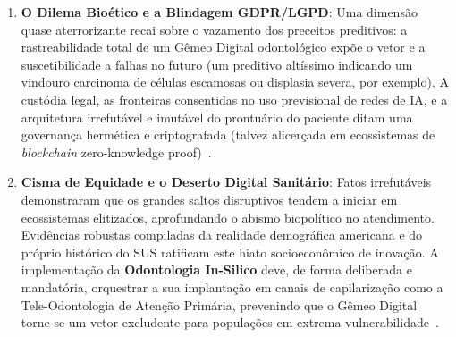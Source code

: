 \begin{enumerate}
    \item \textbf{O Dilema Bioético e a Blindagem GDPR/LGPD}: Uma dimensão quase aterrorizante recai sobre o vazamento dos preceitos preditivos: a rastreabilidade total de um Gêmeo Digital odontológico expõe o vetor e a suscetibilidade a falhas no futuro (um preditivo altíssimo indicando um vindouro carcinoma de células escamosas ou displasia severa, por exemplo). A custódia legal, as fronteiras consentidas no uso previsional de redes de IA, e a arquitetura irrefutável e imutável do prontuário do paciente ditam uma governança hermética e criptografada (talvez alicerçada em ecossistemas de \textit{blockchain} zero-knowledge proof)~\cite{springer2026realising}.
    \item \textbf{Cisma de Equidade e o Deserto Digital Sanitário}: Fatos irrefutáveis demonstraram que os grandes saltos disruptivos tendem a iniciar em ecossistemas elitizados, aprofundando o abismo biopolítico no atendimento. Evidências robustas compiladas da realidade demográfica americana e do próprio histórico do SUS ratificam este hiato socioeconômico de inovação. A implementação da \textbf{Odontologia In-Silico} deve, de forma deliberada e mandatória, orquestrar a sua implantação em canais de capilarização como a Tele-Odontologia de Atenção Primária, prevenindo que o Gêmeo Digital torne-se um vetor excludente para populações em extrema vulnerabilidade~\cite{cuadros2023assessing}.
\end{enumerate}

